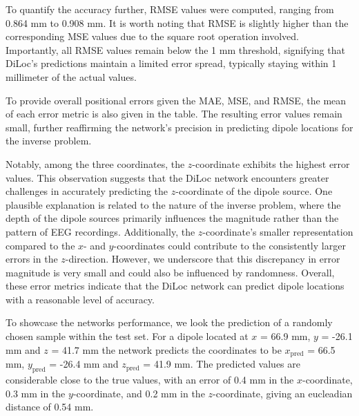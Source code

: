 \documentclass[a4paper, UKenglish, 11pt]{uiomaster}
\begin{document}
To quantify the accuracy further, RMSE values were computed, ranging from 0.864 mm to 0.908 mm. It is worth noting that RMSE is slightly higher than the corresponding MSE values due to the square root operation involved. Importantly, all RMSE values remain below the 1 mm threshold, signifying that DiLoc's predictions maintain a limited error spread, typically staying within 1 millimeter of the actual values.

To provide overall positional errors given the MAE, MSE, and RMSE, the mean of each error metric is also given in the table. The resulting error values remain small, further reaffirming the network's precision in predicting dipole locations for the inverse problem.

Notably, among the three coordinates, the $z$-coordinate exhibits the highest error values. This observation suggests that the DiLoc network encounters greater challenges in accurately predicting the $z$-coordinate of the dipole source. One plausible explanation is related to the nature of the inverse problem, where the depth of the dipole sources primarily influences the magnitude rather than the pattern of EEG recordings. Additionally, the $z$-coordinate's smaller representation compared to the $x$- and $y$-coordinates could contribute to the consistently larger errors in the $z$-direction. However, we underscore that this discrepancy in error magnitude is very small and could also be influenced by randomness. Overall, these error metrics indicate that the DiLoc network can predict dipole locations with a reasonable level of accuracy.

To showcase the networks performance, we look the prediction of a randomly chosen sample within the test set. For a dipole located at $x$ = 66.9 mm, $y$ = -26.1 mm and $z$ = 41.7 mm the network predicts the coordinates to be $x_{\text{pred}}$ = 66.5 mm, $y_{\text{pred}}$ = -26.4 mm and $z_{\text{pred}}$ =  41.9 mm. The predicted values are considerable close to the true values, with an error of 0.4 mm in the $x$-coordinate, 0.3 mm in the $y$-coordinate, and 0.2 mm in the $z$-coordinate, giving an eucleadian distance of 0.54 mm.
\end{document}
